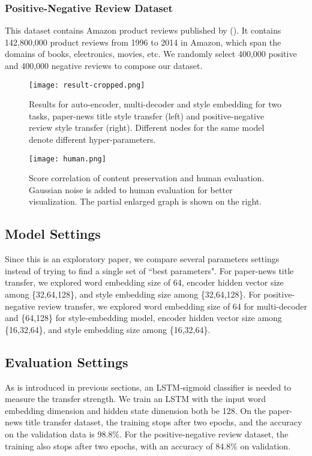 \documentclass[letterpaper]{article} \usepackage{aaai18}  \usepackage{times}  \usepackage{helvet}  \usepackage{courier}  \usepackage{url}  \usepackage{graphicx}  \usepackage{amsmath}
\newcommand{\newcite}[1]{\citeauthor{#1} (\citeyear{#1})}
\begin{document}
\subsubsection{Positive-Negative Review Dataset}
This dataset contains Amazon product reviews published by \newcite{he2016ups}. 
It contains 142,800,000 product reviews from 1996 to 2014 in Amazon, which span the domains of
books, electronics, movies, etc. 
We randomly select 400,000 positive and 400,000 negative reviews to compose our dataset.

\begin{figure*}[htb]
\centering
\texttt{[image: result-cropped.png]}

\caption{Results for auto-encoder, multi-decoder and style embedding for two tasks, 
paper-news title style transfer (left) and positive-negative review style transfer (right).
Different nodes for the same model denote different hyper-parameters.}
\label{figure_result}
\end{figure*}

\begin{figure}[]
\texttt{[image: human.png]}
\caption{Score correlation of content preservation and human evaluation. Gaussian noise is added to human evaluation for better visualization. The partial enlarged graph is shown on the right.}
\label{figure_correlation}
\end{figure}

\subsection{Model Settings} 

Since this is an exploratory paper, we compare several parameters settings instead 
of trying to find a single set of ``best parameters".
For paper-news title transfer, we explored word embedding size of 64, 
encoder hidden vector size among \{32,64,128\}, and style embedding size among \{32,64,128\}.
For positive-negative review transfer, we explored word embedding size 
of 64 for multi-decoder and \{64,128\} for style-embedding model, encoder hidden vector size among \{16,32,64\},
and style embedding size among \{16,32,64\}. 

\subsection{Evaluation Settings}
As is introduced in previous sections, an LSTM-sigmoid classifier is needed to measure the transfer strength. 
We train an LSTM with the input word embedding dimension and hidden state dimension both be 128. 
On the paper-news title transfer dataset, the training stops after two epochs, and the accuracy on the validation data is 98.8\%.
For the positive-negative review dataset, the training also stops after two epochs, with an accuracy of 84.8\% on validation.
\end{document}
